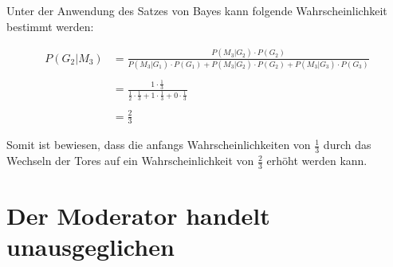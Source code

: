 Unter der Anwendung des Satzes von Bayes kann folgende Wahrscheinlichkeit bestimmt werden:

\begin{equation}
    \begin{split}
        P(G_2 | M_3) & = \frac{P(M_3 | G_2) \cdot P(G_2)}{P(M_3 | G_1) \cdot P(G_1) +
        P(M_3 | G_2) \cdot P(G_2) + P(M_3 | G_3) \cdot P(G_3)} 
        \\
        \\
        & = \frac{1 \cdot \frac{1}{3}}{\frac{1}{2} \cdot \frac{1}{3} + 1 \cdot \frac{1}{3} + 0 \cdot \frac{1}{3}} 
        \\
        \\
        & = \frac{2}{3}
    \end{split}
\end{equation}

Somit ist bewiesen, dass die anfangs Wahrscheinlichkeiten von $\frac{1}{3}$ durch das Wechseln der Tores auf ein Wahrscheinlichkeit von $\frac{2}{3}$ erhöht werden kann.  
\newpage
\section{Der Moderator handelt unausgeglichen}
